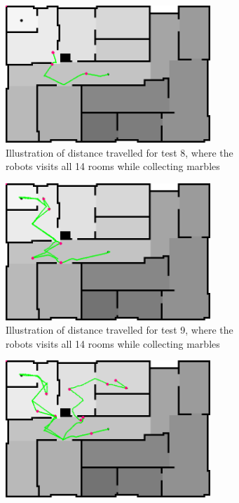 \documentclass[../Head/Main.tex]{subfiles}
\begin{document}
\begin{figure}[H]
\begin{subfigure}[b]{0.49\textwidth}
    \includegraphics[width=0.85\textwidth]{../Figures/Modelbased/brushfireMarble8}
    \caption{Illustration of distance travelled for test 8, where the robots visits all 14 rooms while collecting marbles}
    \label{fig:Marble8}
  \end{subfigure}
  \hfill
  \begin{subfigure}[b]{0.49\textwidth}
  \centering
  \includegraphics[width=0.85\textwidth]{../Figures/Modelbased/brushfireMarble9}
    \caption{Illustration of distance travelled for test 9, where the robots visits all 14 rooms while collecting marbles}
    \label{fig:Marble9}
  \end{subfigure}
  \hfill
  \begin{subfigure}[b]{0.49\textwidth}
    \centering
    \includegraphics[width=0.85\textwidth]{../Figures/Modelbased/brushfireMarble10}

\end{subfigure}
\end{figure}
\end{document}
